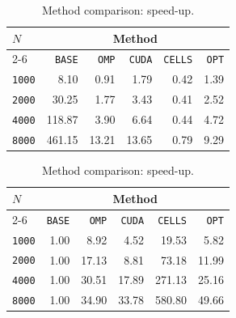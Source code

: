 \documentclass[11pt]{article}
\begin{document}
\begin{table}[H]
    \centering
    \begin{minipage}{0.48\textwidth}
        \begin{table}[H]
            \centering
            \begin{tabular}{|l|r|r|r|r|r|} \hline
                \cellcolor{blue!10}\textbf{$N$} & \multicolumn{5}{c|}{\cellcolor{blue!10}\textbf{Method}}
                \\ \cline{2-6}
                \cellcolor{blue!10} & \cellcolor{blue!20}\texttt{BASE} & \cellcolor{blue!20}\texttt{OMP} & \cellcolor{blue!20}\texttt{CUDA} & \cellcolor{blue!20}\texttt{CELLS} & \cellcolor{blue!20}\texttt{OPT} \\ \hline
                \texttt{1000} & \cellcolor{red!20}8.10 & 0.91 & 1.79 & \cellcolor{green!20}0.42 & 1.39 \\ \hline
                \texttt{2000} & \cellcolor{red!20}30.25 & 1.77 & 3.43 & \cellcolor{green!20}0.41 & 2.52 \\ \hline
                \texttt{4000} & \cellcolor{red!20}118.87 & 3.90 & 6.64 & \cellcolor{green!20}0.44 & 4.72 \\ \hline
                \texttt{8000} & \cellcolor{red!20}461.15 & 13.21 & 13.65 & \cellcolor{green!20}0.79 & 9.29 \\ \hline
            \end{tabular}
            \caption{Method comparison: absolute times (s).}
        \end{table}
    \end{minipage}
    \hfill
    \begin{minipage}{0.48\textwidth}
        \begin{table}[H]
            \centering
            \begin{tabular}{|l|r|r|r|r|r|} \hline
                \cellcolor{blue!10}\textbf{$N$} & \multicolumn{5}{c|}{\cellcolor{blue!10}\textbf{Method}}
                \\ \cline{2-6}
                \cellcolor{blue!10} & \cellcolor{blue!20}\texttt{BASE} & \cellcolor{blue!20}\texttt{OMP} & \cellcolor{blue!20}\texttt{CUDA} & \cellcolor{blue!20}\texttt{CELLS} & \cellcolor{blue!20}\texttt{OPT} \\ \hline
                \texttt{1000} & \cellcolor{red!20}1.00 & 8.92 & 4.52 & \cellcolor{green!20}19.53 & 5.82 \\ \hline
                \texttt{2000} & \cellcolor{red!20}1.00 & 17.13 & 8.81 & \cellcolor{green!20}73.18 & 11.99 \\ \hline
                \texttt{4000} & \cellcolor{red!20}1.00 & 30.51 & 17.89 & \cellcolor{green!20}271.13 & 25.16 \\ \hline
                \texttt{8000} & \cellcolor{red!20}1.00 & 34.90 & 33.78 & \cellcolor{green!20}580.80 & 49.66 \\ \hline
            \end{tabular}
            \caption{Method comparison: speed-up.}
        \end{table}
    \end{minipage}
\end{table}
\end{document}
